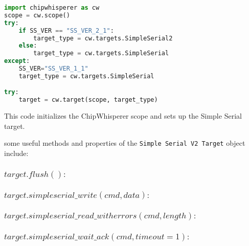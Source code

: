 \begin{lstlisting}[language=Python]
import chipwhisperer as cw
scope = cw.scope()
try:
    if SS_VER == "SS_VER_2_1":
        target_type = cw.targets.SimpleSerial2
    else:
        target_type = cw.targets.SimpleSerial
except:
    SS_VER="SS_VER_1_1"
    target_type = cw.targets.SimpleSerial

try:
    target = cw.target(scope, target_type)
\end{lstlisting}

This code initializes the ChipWhisperer scope and sets up the Simple Serial target.

some useful methods and properties of the \texttt{Simple Serial V2 Target} object include:
\subsubsection{$target.flush() :$}

\subsubsection{$target.simpleserial\_write(cmd, data) :$}

\subsubsection{$target.simpleserial\_read\_witherrors(cmd, length) :$}

\subsubsection{$target.simpleserial\_wait\_ack(cmd, timeout=1) :$}

\subsection{}